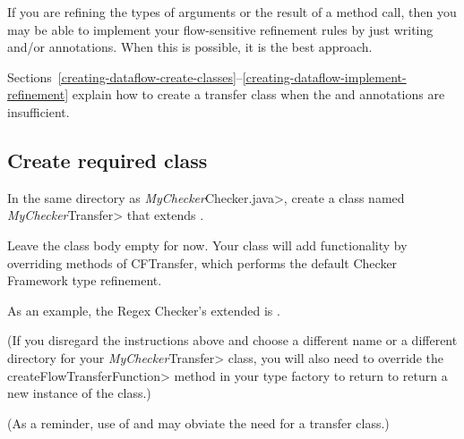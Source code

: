 If you are refining the types of arguments or the result of a method call,
then you may be able to implement your flow-sensitive refinement rules by
just writing  and/or
 annotations.
When this is possible, it is the best approach.

Sections~\ref{creating-dataflow-create-classes}--\ref{creating-dataflow-implement-refinement}
explain how to create a transfer class when the
 and
 annotations are insufficient.


\subsection{Create required class\label{creating-dataflow-create-classes}}

In the same directory as \<\emph{MyChecker}Checker.java>, create a class
named \<\emph{MyChecker}Transfer> that extends
.

Leave the class body empty for now.  Your class will add functionality by
overriding methods of CFTransfer, which performs the default Checker
Framework type refinement.

As an example, the Regex Checker's extended
 is
.

(If you disregard the instructions above and choose a different name or a
different directory for your \<\emph{MyChecker}Transfer> class, you will
also need to override the \<createFlowTransferFunction> method in your type
factory to return to return a new instance of the class.)

(As a reminder, use of  and
 may obviate the need for
a transfer class.)

%

